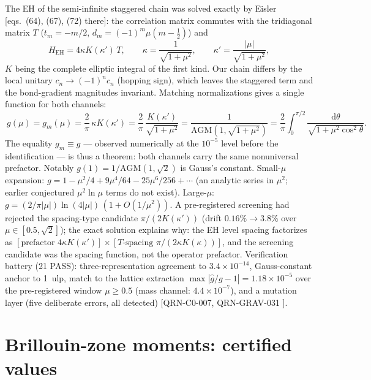 \documentclass[aps,prb,preprint,nofootinbib]{revtex4-2}
\begin{document}
The EH of the semi-infinite staggered chain was solved exactly by Eisler
\cite{Eisler2024} [eqs.~(64), (67), (72) there]: the correlation matrix
commutes with the tridiagonal matrix $T$ ($t_m = -m/2$,
$d_m = (-1)^m \mu(m-\tfrac12)$) and
\begin{equation}
H_{\mathrm{EH}} = 4\kappa K(\kappa')\, T,\qquad
\kappa = \frac{1}{\sqrt{1+\mu^2}},\qquad
\kappa' = \frac{|\mu|}{\sqrt{1+\mu^2}},
\end{equation}
$K$ being the complete elliptic integral of the first kind. Our chain differs
by the local unitary $c_n \to (-1)^n c_n$ (hopping sign), which leaves the
staggered term and the bond-gradient magnitudes invariant. Matching
normalizations gives a single function for both channels:
\begin{equation}
\boxed{\ g(\mu) = g_m(\mu) = \frac{2}{\pi}\,\kappa K(\kappa')
= \frac{2}{\pi}\,\frac{K(\kappa')}{\sqrt{1+\mu^2}}
= \frac{1}{\mathrm{AGM}(1,\sqrt{1+\mu^2})}
= \frac{2}{\pi}\int_0^{\pi/2}\!\frac{\mathrm{d}\theta}{\sqrt{1+\mu^2\cos^2\theta}}.\ }
\end{equation}
The equality $g_m \equiv g$ --- observed numerically at the $10^{-5}$ level
before the identification --- is thus a theorem: both channels carry the same
nonuniversal prefactor. Notably $g(1) = 1/\mathrm{AGM}(1,\sqrt 2)$ is Gauss's
constant. Small-$\mu$ expansion:
$g = 1 - \mu^2/4 + 9\mu^4/64 - 25\mu^6/256 + \cdots$ (an analytic series in
$\mu^2$; earlier conjectured $\mu^2\ln\mu$ terms do not exist). Large-$\mu$:
$g = (2/\pi|\mu|)\ln(4|\mu|)\,(1+O(1/\mu^2))$. A pre-registered screening had
rejected the spacing-type candidate $\pi/(2K(\kappa'))$ (drift
$0.16\% \to 3.8\%$ over $\mu \in [0.5,\sqrt 2]$); the exact solution explains
why: the EH level spacing factorizes as
$[\text{prefactor } 4\kappa K(\kappa')] \times [T\text{-spacing } \pi/(2\kappa K(\kappa))]$,
and the screening candidate was the spacing function, not the operator
prefactor. Verification battery (21 PASS): three-representation agreement to
$3.4\times10^{-14}$, Gauss-constant anchor to 1~ulp, match to the lattice
extraction $\max|\hat g/g - 1| = 1.18\times10^{-5}$ over the pre-registered
window $\mu \ge 0.5$ (mass channel: $4.4\times10^{-7}$), and a mutation layer
(five deliberate errors, all detected) [QRN-C0-007, QRN-GRAV-031 \cite{Repo}].

\section{Brillouin-zone moments: certified values}
\end{document}

